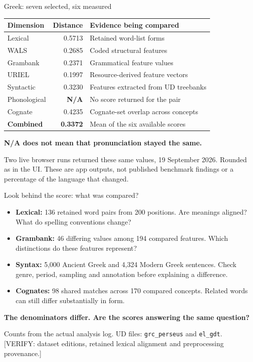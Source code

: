 \documentclass[aspectratio=169,10pt]{beamer}
\newcommand{\key}[1]{\textcolor{aegean}{\textbf{#1}}}
\newcommand{\hl}[1]{\textcolor{terracotta}{\textbf{#1}}}
\newcommand{\source}[1]{\vfill{\scriptsize\color{slate}#1\par}}
\newcommand{\question}[1]{\medskip\par\key{#1}\par}
\begin{document}
\begin{frame}{Greek: seven selected, six measured}
  \small
  \begin{tabularx}{\textwidth}{@{}lrX@{}}
    \toprule
    \textbf{Dimension} & \textbf{Distance} & \textbf{Evidence being compared}\\
    \midrule
    Lexical & 0.5713 & Retained word-list forms\\[3pt]
    WALS & 0.2685 & Coded structural features\\[3pt]
    Grambank & 0.2371 & Grammatical feature values\\[3pt]
    URIEL & 0.1997 & Resource-derived feature vectors\\[3pt]
    Syntactic & 0.3230 & Features extracted from UD treebanks\\[3pt]
    Phonological & \hl{N/A} & No score returned for the pair\\[3pt]
    Cognate & 0.4235 & Cognate-set overlap across concepts\\
    \midrule
    \textbf{Combined} & \textbf{0.3372} & Mean of the six available scores\\
    \bottomrule
  \end{tabularx}
  \question{N/A does not mean that pronunciation stayed the same.}
  \source{Two live browser runs returned these same values, 19 September 2026. Rounded as in the UI.\newline
  These are app outputs, not published benchmark findings or a percentage of the language that changed.}
\end{frame}

\begin{frame}{Look behind the score: what was compared?}
  \small
  \begin{itemize}
    \item \textbf{Lexical:} 136 retained word pairs from 200 positions.\newline
      Are meanings aligned? What do spelling conventions change?
    \item \textbf{Grambank:} 46 differing values among 194 compared features.\newline
      Which distinctions do these features represent?
    \item \textbf{Syntax:} 5,000 Ancient Greek and 4,324 Modern Greek sentences.\newline
      Check genre, period, sampling and annotation before explaining a difference.
    \item \textbf{Cognates:} 98 shared matches across 170 compared concepts.\newline
      Related words can still differ substantially in form.
  \end{itemize}
  \question{The denominators differ. Are the scores answering the same question?}
  \source{Counts from the actual analysis log. UD files: \texttt{grc\_perseus} and \texttt{el\_gdt}.\newline
  {}[VERIFY: dataset editions, retained lexical alignment and preprocessing provenance.]}
\end{frame}
\end{document}
